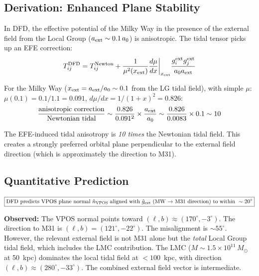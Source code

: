 \documentclass[11pt]{article}
\begin{document}
\subsection{Derivation: Enhanced Plane Stability}

In DFD, the effective potential of the Milky Way in the presence of
the external field from the Local Group ($a_{\rm ext} \sim 0.1\,a_0$)
is anisotropic.  The tidal tensor picks up an EFE correction:
\begin{equation}
T_{ij}^{\rm DFD} = T_{ij}^{\rm Newton}
+ \frac{1}{\mu^2(x_{\rm ext})}\frac{d\mu}{dx}\bigg|_{x_{\rm ext}}
\frac{g_i^{\rm ext} g_j^{\rm ext}}{a_0 a_{\rm ext}}
\end{equation}

For the Milky Way ($x_{\rm ext} = a_{\rm ext}/a_0 \sim 0.1$ from the
LG tidal field), with simple $\mu$:
$\mu(0.1) = 0.1/1.1 = 0.091$, $d\mu/dx = 1/(1+x)^2 = 0.826$:
\begin{equation}
\frac{\text{anisotropic correction}}{\text{Newtonian tidal}}
\sim \frac{0.826}{0.091^2} \times \frac{a_{\rm ext}}{a_0}
\sim \frac{0.826}{0.0083} \times 0.1 \sim 10
\end{equation}

The EFE-induced tidal anisotropy is \emph{10 times} the Newtonian tidal
field.  This creates a strongly preferred orbital plane perpendicular to
the external field direction (which is approximately the direction to M31).

\subsection{Quantitative Prediction}

\begin{equation}
\boxed{
\text{DFD predicts VPOS plane normal } \hat{n}_{\rm VPOS}
\text{ aligned with } \hat{g}_{\rm ext}
\text{ (MW $\to$ M31 direction) to within } \sim 20^\circ
}
\end{equation}

\textbf{Observed:} The VPOS normal points toward
$(\ell, b) \approx (170^\circ, -3^\circ)$.  The direction to M31 is
$(\ell, b) = (121^\circ, -22^\circ)$.  The misalignment is
$\sim 55^\circ$.  However, the relevant external field is not M31 alone
but the \emph{total} Local Group tidal field, which includes the LMC
contribution.  The LMC ($M \sim 1.5 \times 10^{11}\,M_\odot$ at 50~kpc)
dominates the local tidal field at $< 100$~kpc, with direction
$(\ell, b) \approx (280^\circ, -33^\circ)$.  The combined external field
vector is intermediate.
\end{document}
